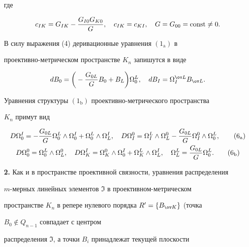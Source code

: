 где 


$$ 


c_{IK}=G_{IK}-\frac{G_{I0}G_{K0}}{G},\quad c_{IK}=c_{KI},\quad 


G=G_{00}=\const\ne0. 


$$ 


В силу выражения (4) деривационные уравнения $(1_{\mathrm a})$ в 


проективно-метрическом пространстве $K_n$ запишутся в виде 


$$ 


dB_0=\bigg(-\frac{G_{0L}}{G}B_0+B_L \bigg)\Omega^L_0,\quad 


dB_I=\Omega^{\ov L}_I B_{\ov L}. 


$$ 


Уравнения структуры $(1_{\mathrm b})$ проективно-метрического пространства 


$K_n$ примут вид 


\begin{gather} 


D\Omega^I_0=-\frac{G_{0L}}{G}\Omega^L_0\wedge\Omega^I_0+ 


\Omega^L_0\wedge\Omega^I_L,\quad D\Omega^0_I=\Omega^L_I\wedge 


\Omega^0_L-\frac{G_{0L}}{G}\Omega^0_I 


\wedge\Omega^L_0, \tag{6${}_{\mathrm a}$} \\ 


% 


D\Omega^0_0=\Omega^L_0\wedge\Omega^0_L,\quad 


D\Omega^I_K=\Omega^0_K\wedge\Omega^I_0+\Omega^L_K\wedge 


\Omega^I_L,\quad \Omega^L_L=\frac{G_{0L}}{G}\Omega^L_0. 


\tag{6${}_{\mathrm b}$} 


\end{gather} 


\addtocounter{equation}{2}


 


{\bf 2.} Как и в пространстве проективной связности, уравнения распределения 


$m$-мерных линейных элементов $\Im$ в проективном-метрическом 


пространстве $K_n$ в репере нулевого порядка $R'=\{B_{\ov K}\}$ (точка 


$B_0\notin Q_{n-1}$ совпадает с центром 


распределения $\Im$, а точки $B_i$ принадлежат текущей плоскости 


